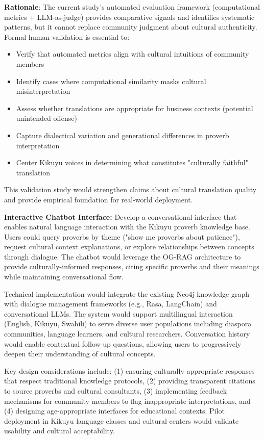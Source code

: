 \textbf{Rationale}: The current study's automated evaluation framework (computational metrics + LLM-as-judge) provides comparative signals and identifies systematic patterns, but it cannot replace community judgment about cultural authenticity. Formal human validation is essential to:
\begin{itemize}
    \item Verify that automated metrics align with cultural intuitions of community members
    \item Identify cases where computational similarity masks cultural misinterpretation
    \item Assess whether translations are appropriate for business contexts (potential unintended offense)
    \item Capture dialectical variation and generational differences in proverb interpretation
    \item Center Kikuyu voices in determining what constitutes "culturally faithful" translation
\end{itemize}

This validation study would strengthen claims about cultural translation quality and provide empirical foundation for real-world deployment.

\textbf{Interactive Chatbot Interface:} Develop a conversational interface that enables natural language interaction with the Kikuyu proverb knowledge base. Users could query proverbs by theme ("show me proverbs about patience"), request cultural context explanations, or explore relationships between concepts through dialogue. The chatbot would leverage the OG-RAG architecture to provide culturally-informed responses, citing specific proverbs and their meanings while maintaining conversational flow.

Technical implementation would integrate the existing Neo4j knowledge graph with dialogue management frameworks (e.g., Rasa, LangChain) and conversational LLMs. The system would support multilingual interaction (English, Kikuyu, Swahili) to serve diverse user populations including diaspora communities, language learners, and cultural researchers. Conversation history would enable contextual follow-up questions, allowing users to progressively deepen their understanding of cultural concepts.

Key design considerations include: (1) ensuring culturally appropriate responses that respect traditional knowledge protocols, (2) providing transparent citations to source proverbs and cultural consultants, (3) implementing feedback mechanisms for community members to flag inappropriate interpretations, and (4) designing age-appropriate interfaces for educational contexts. Pilot deployment in Kikuyu language classes and cultural centers would validate usability and cultural acceptability.

